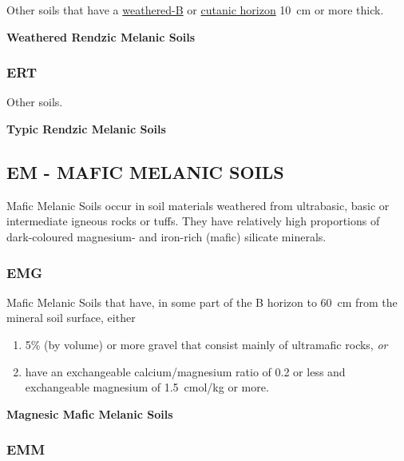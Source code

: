 \documentclass[
  letterpaper,
  DIV=11,
  numbers=noendperiod]{scrreprt}
\providecommand{\tightlist}{%
  \setlength{\itemsep}{0pt}\setlength{\parskip}{0pt}}\usepackage{longtable,booktabs,array}
\begin{document}
Other soils that have a \protect\hyperlink{sec-diag-bw}{weathered-B} or
\protect\hyperlink{sec-diag-cuth}{cutanic horizon} 10~cm or more thick.

\textbf{Weathered Rendzic Melanic Soils}

\hypertarget{sec-key-ERT}{%
\subsubsection{\texorpdfstring{\textbf{ERT}}{ERT}}\label{sec-key-ERT}}

Other soils.

\textbf{Typic Rendzic Melanic Soils}

\hypertarget{sec-EM}{%
\subsection{\texorpdfstring{\textbf{EM} - MAFIC MELANIC
SOILS}{EM - MAFIC MELANIC SOILS}}\label{sec-EM}}

Mafic Melanic Soils occur in soil materials weathered from ultrabasic,
basic or intermediate igneous rocks or tuffs. They have relatively high
proportions of dark-coloured magnesium- and iron-rich (mafic) silicate
minerals.

\hypertarget{sec-key-EMG}{%
\subsubsection{\texorpdfstring{\textbf{EMG}}{EMG}}\label{sec-key-EMG}}

Mafic Melanic Soils that have, in some part of the B horizon to 60~cm
from the mineral soil surface, either

\begin{enumerate}
\def\labelenumi{\arabic{enumi}.}
\tightlist
\item
  5\% (by volume) or more gravel that consist mainly of ultramafic
  rocks, \emph{or}
\item
  have an exchangeable calcium/magnesium ratio of 0.2 or less and
  exchangeable magnesium of 1.5~cmol/kg or more.
\end{enumerate}

\textbf{Magnesic Mafic Melanic Soils}

\hypertarget{sec-key-EMM}{%
\subsubsection{\texorpdfstring{\textbf{EMM}}{EMM}}\label{sec-key-EMM}}
\end{document}
